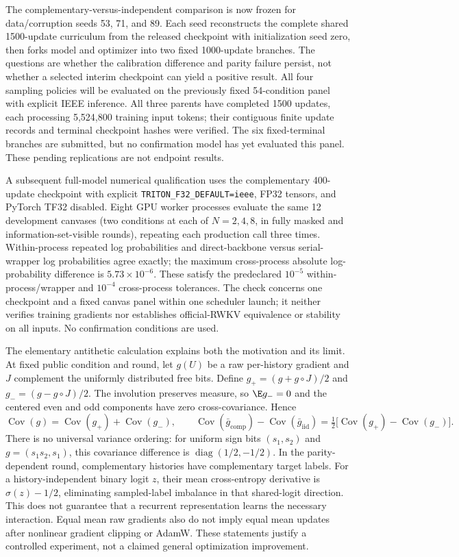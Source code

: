 The complementary-versus-independent comparison is now frozen for data/corruption seeds 53, 71, and 89. Each seed reconstructs the complete shared 1500-update curriculum from the released checkpoint with initialization seed zero, then forks model and optimizer into two fixed 1000-update branches. The questions are whether the calibration difference and parity failure persist, not whether a selected interim checkpoint can yield a positive result. All four sampling policies will be evaluated on the previously fixed 54-condition panel with explicit IEEE inference. All three parents have completed 1500 updates, each processing 5,524,800 training input tokens; their contiguous finite update records and terminal checkpoint hashes were verified. The six fixed-terminal branches are submitted, but no confirmation model has yet evaluated this panel. These pending replications are not endpoint results.

A subsequent full-model numerical qualification uses the complementary 400-update checkpoint with explicit \texttt{TRITON\_F32\_DEFAULT=ieee}, FP32 tensors, and PyTorch TF32 disabled. Eight GPU worker processes evaluate the same 12 development canvases (two conditions at each of $N=2,4,8$, in fully masked and information-set-visible rounds), repeating each production call three times. Within-process repeated log probabilities and direct-backbone versus serial-wrapper log probabilities agree exactly; the maximum cross-process absolute log-probability difference is $5.73\times10^{-6}$. These satisfy the predeclared $10^{-5}$ within-process/wrapper and $10^{-4}$ cross-process tolerances. The check concerns one checkpoint and a fixed canvas panel within one scheduler launch; it neither verifies training gradients nor establishes official-RWKV equivalence or stability on all inputs. No confirmation conditions are used.


The elementary antithetic calculation explains both the motivation and its limit. At fixed public condition and round, let $g(U)$ be a raw per-history gradient and $J$ complement the uniformly distributed free bits. Define $g_+=(g+g\circ J)/2$ and $g_-=(g-g\circ J)/2$. The involution preserves measure, so $\E g_-=0$ and the centered even and odd components have zero cross-covariance. Hence
\[
\operatorname{Cov}(g)=\operatorname{Cov}(g_+)+\operatorname{Cov}(g_-),\qquad
\operatorname{Cov}(\bar g_{\mathrm{comp}})-\operatorname{Cov}(\bar g_{\mathrm{iid}})
=\tfrac12\bigl[\operatorname{Cov}(g_+)-\operatorname{Cov}(g_-)\bigr].
\]
There is no universal variance ordering: for uniform sign bits $(s_1,s_2)$ and $g=(s_1s_2,s_1)$, this covariance difference is $\operatorname{diag}(1/2,-1/2)$. In the parity-dependent round, complementary histories have complementary target labels. For a history-independent binary logit $z$, their mean cross-entropy derivative is $\sigma(z)-1/2$, eliminating sampled-label imbalance in that shared-logit direction. This does not guarantee that a recurrent representation learns the necessary interaction. Equal mean raw gradients also do not imply equal mean updates after nonlinear gradient clipping or AdamW. These statements justify a controlled experiment, not a claimed general optimization improvement.


